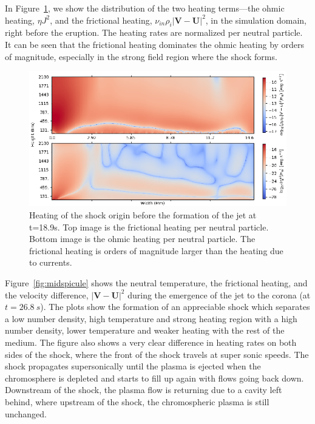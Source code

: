 \documentclass[12pt,upcase]{umlthesis}
\begin{document}
In Figure~\ref{fig:prespicule}, we show the distribution of the two heating terms---the ohmic heating, $\eta J^2$, and the frictional heating, $\nu_{in} \rho_i |\textbf{V} - \textbf{U}|^2$, in the simulation domain, right before the eruption. The heating rates are normalized per neutral particle. It can be seen that the frictional heating dominates the ohmic heating by orders of magnitude, especially in the strong field region where the shock forms.

\begin{figure}[ht!]
    \centering
    \includegraphics[width=1\textwidth]{images/prespicule.eps}
    \caption{Heating of the shock origin before the formation of the jet at t=18.9s. Top image is the frictional heating per neutral particle. Bottom image is the ohmic heating per neutral particle. The frictional heating is orders of magnitude larger than the heating due to currents.}\label{fig:prespicule}
\end{figure}

Figure~\ref{fig:midspicule} shows the neutral temperature, the frictional heating, and the velocity difference, $| \textbf{V} - \textbf{U}|^2$ during the emergence of the jet to the corona (at $t=26.8~s$). The plots show the formation of an appreciable shock which separates a low number density, high temperature and strong heating region with a high number density, lower temperature and weaker heating with the rest of the medium. The figure also shows a very clear difference in heating rates on both sides of the shock, where the front of the shock travels at super sonic speeds. The shock propagates supersonically until the plasma is ejected when the chromosphere is depleted and starts to fill up again with flows going back down. Downstream of the shock, the plasma flow is returning due to a cavity left behind, where upstream of the shock, the chromospheric plasma is still unchanged.
\end{document}
